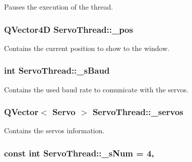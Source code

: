 Pauses the execution of the thread. 

\hypertarget{a00009_a6ad7cef9e9ac7454399871260e3693d4}{}
\subsubsection[{\+\_\+pos}]{\setlength{\rightskip}{0pt plus 5cm}Q\+Vector4\+D Servo\+Thread\+::\+\_\+pos\hspace{0.3cm}{\ttfamily [private]}}\label{a00009_a6ad7cef9e9ac7454399871260e3693d4}


Contains the current position to show to the window. 

\hypertarget{a00009_a5b9a41b9e271275b914affb0a845a2ee}{}
\subsubsection[{\+\_\+s\+Baud}]{\setlength{\rightskip}{0pt plus 5cm}int Servo\+Thread\+::\+\_\+s\+Baud\hspace{0.3cm}{\ttfamily [private]}}\label{a00009_a5b9a41b9e271275b914affb0a845a2ee}


Contains the used baud rate to comunicate with the servos. 

\hypertarget{a00009_a1ac6662fe6d198b5971ae0ffa7ddfcfd}{}
\subsubsection[{\+\_\+servos}]{\setlength{\rightskip}{0pt plus 5cm}Q\+Vector$<$ {\bf Servo} $>$ Servo\+Thread\+::\+\_\+servos\hspace{0.3cm}{\ttfamily [private]}}\label{a00009_a1ac6662fe6d198b5971ae0ffa7ddfcfd}


Contains the servos information. 

\hypertarget{a00009_a334e0c5bca9ccb2585cb82bce60ea42f}{}
\subsubsection[{\+\_\+s\+Num}]{\setlength{\rightskip}{0pt plus 5cm}const int Servo\+Thread\+::\+\_\+s\+Num = 4\hspace{0.3cm}{\ttfamily [static]}, {\ttfamily [private]}}\label{a00009_a334e0c5bca9ccb2585cb82bce60ea42f}


